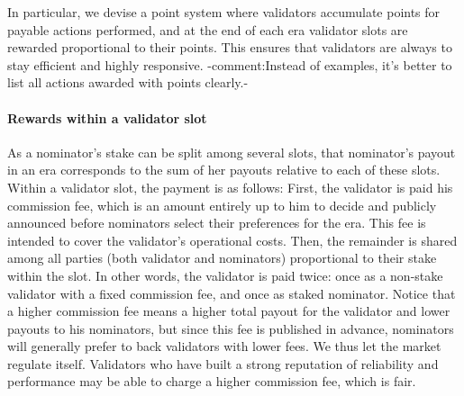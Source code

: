 In particular, we devise a point system where validators accumulate points for payable actions performed, 
and at the end of each era validator slots are rewarded proportional to their points. 
This ensures that validators are always  to stay efficient and highly responsive.
{-comment:Instead of examples, it's better to list all actions awarded with points clearly.-}

\paragraph{Rewards within a validator slot} As a nominator's stake can be split among several slots, 
that nominator's payout in an era corresponds to the sum of her payouts relative to each of these slots. 
Within a validator slot, the payment is as follows: 
First, the validator is paid his commission fee, which is an amount entirely up to him to decide and  publicly announced before nominators select their preferences for the era. 
This fee is intended to cover the validator's operational costs. 
Then, the remainder is shared among all parties (both validator and nominators) proportional to their stake within the slot. 
In other words, the validator is paid twice: once as a non-stake validator with a fixed commission fee, and once as staked nominator. 
Notice that a higher commission fee means a higher total payout for the validator and lower payouts to his nominators, 
but since this fee is published in advance, nominators will generally prefer to back validators with lower fees. 
We thus let the market regulate itself. Validators who have built a strong reputation of reliability and performance 
may be able to charge a higher commission fee, which is fair.

